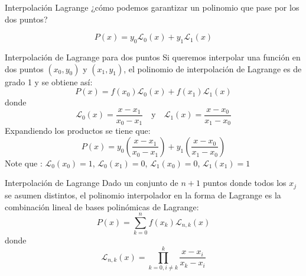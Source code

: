 \documentclass{beamer}
\begin{document}
\begin{frame}{Interpolación Lagrange}
¿cómo podemos garantizar un polinomio que pase por los dos puntos?
   \begin{center}
  \end{center}
    \pause
    \[
    P(x) = y_0 \mathscr{L}_0(x) + y_1 \mathscr{L}_1(x)
    \]
\end{frame}

\begin{frame}{Interpolación de Lagrange para dos puntos}
    Si queremos interpolar una función en dos puntos $(x_0,y_0)$ y $(x_1,y_1)$, el polinomio de interpolación de Lagrange es de grado 1 y se obtiene así:
    \[
    P(x) = f(x_0) \mathscr{L}_0(x) + f(x_1) \mathscr{L}_1(x)
    \]
    donde
    \[
    \mathscr{L}_0(x) = \frac{x-x_1}{x_0-x_1} \quad \text{y} \quad \mathscr{L}_1(x) = \frac{x-x_0}{x_1-x_0}
    \]
    Expandiendo los productos se tiene que:
    \[
    P(x) = y_0 \left(\frac{x-x_1}{x_0-x_1} \right)+ y_ 1 \left(\frac{x-x_0}{ x _  1 - x _  0} \right)
    \]
    Note que : $\mathscr{L}_0(x_0)=1$, $\mathscr{L}_0(x_1)=0$, $\mathscr{L}_1(x_0)=0$, $\mathscr{L}_1(x_1)=1$
    
\end{frame}


\begin{frame}{Interpolación de Lagrange}
Dado un conjunto de $n+1$ puntos donde todos los $x_j$ se asumen distintos, el polinomio interpolador en la forma de Lagrange es la combinación lineal de bases polinómicas de Lagrange:
    \[
    P(x) = \sum_{k=0}^n f(x_k) \mathscr{L}_{n,k}(x)
    \]
    donde
    \[
    \mathscr{L}_{n,k}(x) = \prod_{k=0,i\neq k}^k \frac{x-x_i}{x_k-x_i}
    \]
    
\end{frame}
\end{document}
